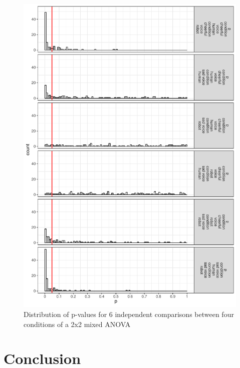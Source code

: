 \documentclass[,jou, draftfirst, a4paper,floatsintext]{apa6}
\begin{document}
\begin{figure}
\centering
\includegraphics{0.1_Simulation_Based_Power_Analysis_For_Factorial_ANOVA_Designs_files/figure-latex/p-plot-1.pdf}
\caption{\label{fig:p-plot}Distribution of p-values for 6 independent comparisons between four conditions of a 2x2 mixed ANOVA}
\end{figure}

\hypertarget{conclusion}{%
\section{Conclusion}\label{conclusion}}
\end{document}
